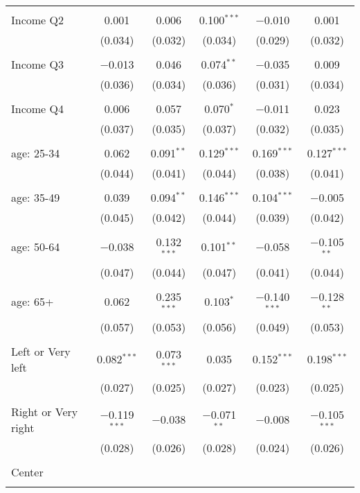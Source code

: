\begin{tabular}{@{\extracolsep{5pt}}lccccc}
  & & & & & \\ 
 Income Q2 & 0.001 & 0.006 & 0.100$^{***}$ & $-$0.010 & 0.001 \\ 
  & (0.034) & (0.032) & (0.034) & (0.029) & (0.032) \\ 
  & & & & & \\ 
 Income Q3 & $-$0.013 & 0.046 & 0.074$^{**}$ & $-$0.035 & 0.009 \\ 
  & (0.036) & (0.034) & (0.036) & (0.031) & (0.034) \\ 
  & & & & & \\ 
 Income Q4 & 0.006 & 0.057 & 0.070$^{*}$ & $-$0.011 & 0.023 \\ 
  & (0.037) & (0.035) & (0.037) & (0.032) & (0.035) \\ 
  & & & & & \\ 
 age: 25-34 & 0.062 & 0.091$^{**}$ & 0.129$^{***}$ & 0.169$^{***}$ & 0.127$^{***}$ \\ 
  & (0.044) & (0.041) & (0.044) & (0.038) & (0.041) \\ 
  & & & & & \\ 
 age: 35-49 & 0.039 & 0.094$^{**}$ & 0.146$^{***}$ & 0.104$^{***}$ & $-$0.005 \\ 
  & (0.045) & (0.042) & (0.044) & (0.039) & (0.042) \\ 
  & & & & & \\ 
 age: 50-64 & $-$0.038 & 0.132$^{***}$ & 0.101$^{**}$ & $-$0.058 & $-$0.105$^{**}$ \\ 
  & (0.047) & (0.044) & (0.047) & (0.041) & (0.044) \\ 
  & & & & & \\ 
 age: 65+ & 0.062 & 0.235$^{***}$ & 0.103$^{*}$ & $-$0.140$^{***}$ & $-$0.128$^{**}$ \\ 
  & (0.057) & (0.053) & (0.056) & (0.049) & (0.053) \\ 
  & & & & & \\ 
 Left or Very left & 0.082$^{***}$ & 0.073$^{***}$ & 0.035 & 0.152$^{***}$ & 0.198$^{***}$ \\ 
  & (0.027) & (0.025) & (0.027) & (0.023) & (0.025) \\ 
  & & & & & \\ 
 Right or Very right & $-$0.119$^{***}$ & $-$0.038 & $-$0.071$^{**}$ & $-$0.008 & $-$0.105$^{***}$ \\ 
  & (0.028) & (0.026) & (0.028) & (0.024) & (0.026) \\ 
  & & & & & \\ 
 Center &  &  &  &  &  \\ 
  &  &  &  &  &  \\ 

\end{tabular}
